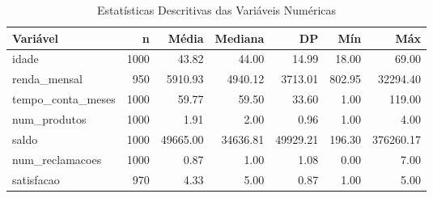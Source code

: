 \begin{table}[htbp]
\centering
\caption{Estatísticas Descritivas das Variáveis Numéricas}
\label{tab:estatisticas}
\small
\setlength{\tabcolsep}{4pt}
\begin{tabular}{lrrrrrr}
\toprule
\textbf{Variável} & \textbf{n} & \textbf{Média} & \textbf{Mediana} & \textbf{DP} & \textbf{Mín} & \textbf{Máx} \\
\midrule
idade & 1000 & 43.82 & 44.00 & 14.99 & 18.00 & 69.00 \\
renda\_mensal & 950 & 5910.93 & 4940.12 & 3713.01 & 802.95 & 32294.40 \\
tempo\_conta\_meses & 1000 & 59.77 & 59.50 & 33.60 & 1.00 & 119.00 \\
num\_produtos & 1000 & 1.91 & 2.00 & 0.96 & 1.00 & 4.00 \\
saldo & 1000 & 49665.00 & 34636.81 & 49929.21 & 196.30 & 376260.17 \\
num\_reclamacoes & 1000 & 0.87 & 1.00 & 1.08 & 0.00 & 7.00 \\
satisfacao & 970 & 4.33 & 5.00 & 0.87 & 1.00 & 5.00 \\
\bottomrule
\end{tabular}
\vspace{2mm}
\end{table}